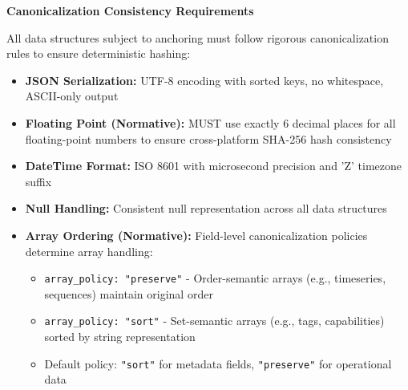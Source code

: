 \documentclass[12pt,a4paper]{article}
\begin{document}
\begin{technicalbox}
\textbf{Canonicalization Consistency Requirements}

All data structures subject to anchoring must follow rigorous canonicalization rules to ensure deterministic hashing:

\begin{itemize}
\item \textbf{JSON Serialization:} UTF-8 encoding with sorted keys, no whitespace, ASCII-only output
\item \textbf{Floating Point (Normative):} MUST use exactly 6 decimal places for all floating-point numbers to ensure cross-platform SHA-256 hash consistency
\item \textbf{DateTime Format:} ISO 8601 with microsecond precision and 'Z' timezone suffix
\item \textbf{Null Handling:} Consistent null representation across all data structures
\item \textbf{Array Ordering (Normative):} Field-level canonicalization policies determine array handling:
\begin{itemize}
    \item \texttt{array\_policy: "preserve"} - Order-semantic arrays (e.g., timeseries, sequences) maintain original order
    \item \texttt{array\_policy: "sort"} - Set-semantic arrays (e.g., tags, capabilities) sorted by string representation 
    \item Default policy: \texttt{"sort"} for metadata fields, \texttt{"preserve"} for operational data
\end{itemize}


\end{itemize}
\end{technicalbox}
\end{document}
